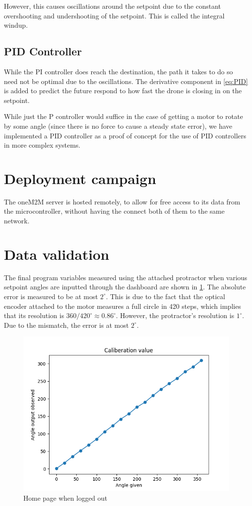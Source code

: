 \documentclass[12pt, a4paper]{article}
\theoremstyle{definition}
\theoremstyle{remark}
\begin{document}
However, this causes oscillations around the setpoint due to the constant overshooting and undershooting of the setpoint. This is called the integral windup.

\subsection{PID Controller}
While the PI controller does reach the destination, the path it takes to do so need not be optimal due to the oscillations. The derivative component in \ref{eq:PID} is added to predict the future respond to how fast the drone is closing in on the setpoint.

While just the P controller would suffice in the case of getting a motor to rotate by some angle (since there is no force to cause a steady state error), we have implemented a PID controller as a proof of concept for the use of PID controllers in more complex systems.

\section{Deployment campaign}
The oneM2M server is hosted remotely, to allow for free access to its data from the microcontroller, without having the connect both of them to the same network.

\section{Data validation}
The final program variables measured using the attached protractor when various setpoint angles are inputted through the dashboard are shown in \cref{fig:calibration}. The absolute error is measured to be at most $2^\circ$. This is due to the fact that the optical encoder attached to the motor measures a full circle in 420 steps, which implies that its resolution is $360/420 ^\circ \approx 0.86 ^\circ$. However, the protractor's resolution is $1^\circ$. Due to the mismatch, the error is at most $2^\circ$.

\begin{figure}[!h]
    \centering
    \includegraphics[scale=0.8]{img/calibration.png}
    \caption{Home page when logged out}
    \label{fig:calibration}
\end{figure}
\end{document}
